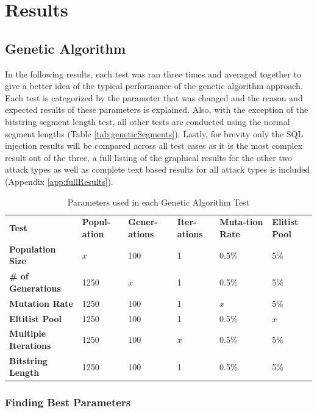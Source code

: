 \chapter{Results} 

\section{Genetic Algorithm}

In the following results, each test was ran three times and averaged together to give a better idea of the typical performance of the genetic algorithm approach.  Each test is categorized by the parameter that was changed and the reason and expected results of these parameters is explained.  Also, with the exception of the bitstring segment length test, all other tests are conducted using the normal segment lengths (Table \ref{tab:geneticSegments}).  Lastly, for brevity only the SQL injection results will be compared across all test cases as it is the most complex result out of the three, a full listing of the graphical results for the other two attack types as well as complete text based results for all attack types is included (Appendix \ref{app:fullResults}).

\begin{table}
	\centering
	\label{tab:gaTestParameters}
	\begin{tabular}{|p{1.5in}|p{0.675in}|p{0.675in}|p{0.675in}|p{0.675in}|p{0.675in}|}
	\hline
	\textbf{Test} & \textbf{Popul-ation} & \textbf{Gener-ations} & \textbf{Iter-ations} & \textbf{Muta-tion Rate} & \textbf{Elitist Pool} \\ 
	\hhline{|=|=|=|=|=|=|}
	\textbf{Population Size} & \textbf{$x$} & 100 & 1 & 0.5\% & 5\% \\
	\hline
	\textbf{\# of Generations} & 1250 & \textbf{$x$} & 1 & 0.5\% & 5\% \\
	\hline
	\textbf{Mutation Rate} & 1250 & 100 & 1 & \textbf{$x$} & 5\% \\
	\hline
	\textbf{Eltitist Pool} & 1250 & 100 & 1 & 0.5\% & \textbf{$x$} \\
	\hline
	\textbf{Multiple Iterations} & 1250 & 100 & \textbf{$x$} & 0.5\% & 5\% \\
	\hline
	\textbf{Bitstring Length} & 1250 & 100 & 1 & 0.5\% & 5\% \\
	\hline
	\end{tabular}
	\caption{Parameters used in each Genetic Algorithm Test}
\end{table}

\subsection{Finding Best Parameters}

